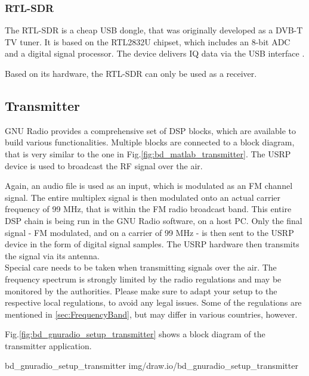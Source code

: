 \subsubsection{RTL-SDR}

The RTL-SDR is a cheap USB dongle, that was originally developed as a DVB-T TV tuner.
It is based on the RTL2832U chipset, which includes an 8-bit ADC and a digital signal processor.
The device delivers IQ data via the USB interface \cite{RTLSDR}.

Based on its hardware, the RTL-SDR can only be used as a receiver.

\subsection{Transmitter}

GNU Radio provides a comprehensive set of DSP blocks, which are available to build various functionalities.
Multiple blocks are connected to a block diagram, that is very similar to the one in Fig.\ref{fig:bd_matlab_transmitter}.
The USRP device is used to broadcast the RF signal over the air.

Again, an audio file is used as an input, which is modulated as an FM channel signal.
The entire multiplex signal is then modulated onto an actual carrier frequency of 99 MHz, that is within the FM radio broadcast band.
This entire DSP chain is being run in the GNU Radio software, on a host PC.
Only the final signal - FM modulated, and on a carrier of 99 MHz - is then sent to the USRP device in the form of digital signal samples.
The USRP hardware then transmits the signal via its antenna.\\

\noindent
Special care needs to be taken when transmitting signals over the air.
The frequency spectrum is strongly limited by the radio regulations and may be monitored by the authorities.
Please make sure to adapt your setup to the respective local regulations, to avoid any legal issues.
Some of the regulations are mentioned in \ref{sec:FrequencyBand}, but may differ in various countries, however.

Fig.\ref{fig:bd_gnuradio_setup_transmitter} shows a block diagram of the transmitter application.

 {bd_gnuradio_setup_transmitter} {img/draw.io/bd_gnuradio_setup_transmitter}


